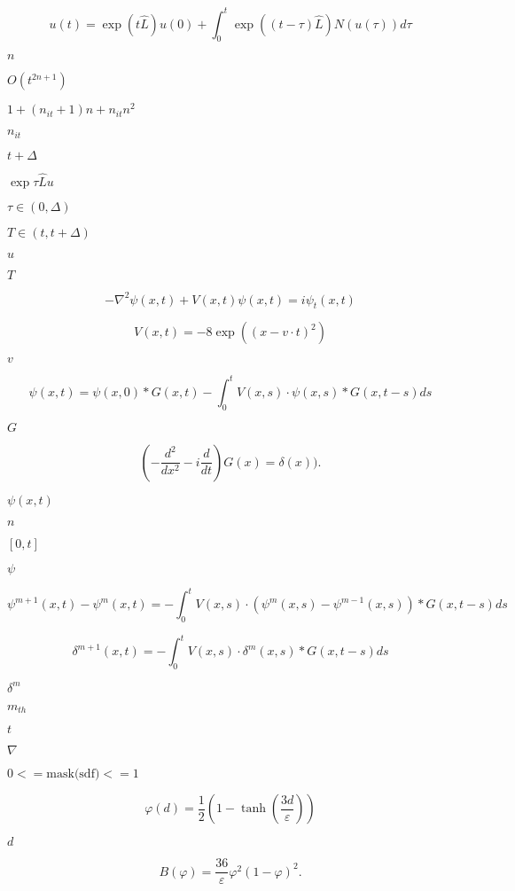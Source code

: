 \documentclass{article}
\begin{document}
\[ u(t) = \exp(t \hat{L} ) u(0) + \int_0^t \exp((t-\tau)\hat{L}) N(u(\tau)) d\tau \]
\pagebreak

$ n $
\pagebreak

$ O\left(t^{2n+1}\right) $
\pagebreak

$ 1+(n_{it}+1)n +n_{it}n^2 $
\pagebreak

$ n_{it} $
\pagebreak

$ t+\Delta $
\pagebreak

$ \exp{\tau \hat{L}} u $
\pagebreak

$ \tau \in (0,\Delta) $
\pagebreak

$ T \in (t,t+\Delta) $
\pagebreak

$ u $
\pagebreak

$ T $
\pagebreak

\[ -\nabla^2 \psi(x,t) + V(x,t) \psi(x,t) = i\psi_t(x,t) \]
\pagebreak

\[ V(x,t) = -8 \exp((x - v \cdot t)^2) \]
\pagebreak

$ v $
\pagebreak

\[ \psi(x,t) = \psi(x,0) * G(x,t) - \int_0^t V(x,s) \cdot \psi(x,s) * G(x,t-s) ds \]
\pagebreak

$ G $
\pagebreak

\[ \left( - \frac{d^2}{dx^2} - i \frac{d}{dt} \right) G(x) = \delta(x)). \]
\pagebreak

$ \psi(x,t) $
\pagebreak

$n$
\pagebreak

$ [0,t] $
\pagebreak

$ \psi $
\pagebreak

\[ \psi^{m+1}(x,t) - \psi^{m}(x,t) = - \int_0^t V(x,s) \cdot ( \psi^{m}(x,s) - \psi^{m-1}(x,s)) * G(x,t-s) ds \]
\pagebreak

\[ \delta^{m+1}(x,t) = - \int_0^t V(x,s) \cdot \delta^{m}(x,s) * G(x,t-s) ds \]
\pagebreak

$ \delta^m $
\pagebreak

$ m_{th} $
\pagebreak

$t$
\pagebreak

$ \nabla $
\pagebreak

$0 <= \mbox{mask(sdf)} <= 1$
\pagebreak

\[ \varphi(d) = \frac{1}{2}\left( 1 - \tanh\left( \frac{3d}{\varepsilon} \right) \right) \]
\pagebreak

$d$
\pagebreak

\[ B(\varphi) = \frac{36}{\varepsilon} \varphi^2 (1-\varphi)^2. \]
\pagebreak
\end{document}
